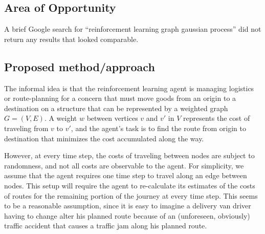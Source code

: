 \begin{figure}
    \label{fig:prop_graph}
\end{figure}


\subsection{Area of Opportunity}

A brief Google search for ``reinforcement learning graph gaussian process'' did not return any results that looked comparable.

\subsection{Proposed method/approach}

The informal idea is that the reinforcement learning agent is managing logistics or route-planning for a concern that must move goods from an origin to a destination on a structure that can be represented by a weighted graph $G = (V, E)$. A weight $w$ between vertices $v$ and $v'$ in $V$ represents the cost of traveling from $v$ to $v'$, and the agent's task is to find the route from origin to destination that minimizes the cost accumulated along the way.

However, at every time step, the costs of traveling between nodes are subject to randomness, and not all costs are observable to the agent. For simplicity, we assume that the agent requires one time step to travel along an edge between nodes. This setup will require the agent to re-calculate its estimates of the costs of routes for the remaining portion of the journey at every time step. This seems to be a reasonable assumption, since it is easy to imagine a delivery van driver having to change alter his planned route because of an (unforeseen, obviously) traffic accident that causes a traffic jam along his planned route.

